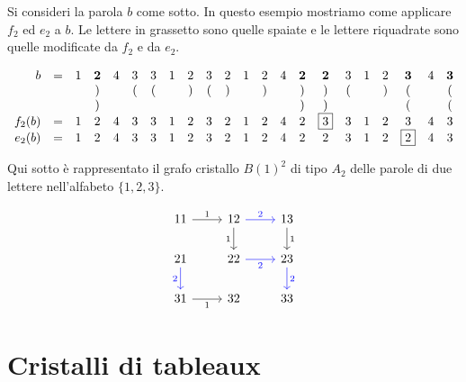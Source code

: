 \begin{example}
    Si consideri la parola $b$ come sotto.
    In questo esempio mostriamo come applicare $f_2$ ed $e_2$ a $b$.
    Le lettere in grassetto sono quelle spaiate e
    le lettere riquadrate sono quelle modificate da $f_2$ e da $e_2$.

    \[
        \begin{array}{r c *{20}{c}}
            b & = & 1 & \mathbf{2} & 4 & 3 & 3 & 1 & 2 & 3 & 2 & 1 & 2 & 4 & 
            \mathbf{2} & \mathbf{2} & 3 & 1 & 2 & \mathbf{3} & 4 & \mathbf{3} \\
              & & & \mathbf{)} & & ( & ( & & ) & ( & ) & & ) & & 
            \mathbf{)} & \mathbf{)} & ( & & ) & \mathbf{\lparen} & & \mathbf{\lparen} \\
              & & & ) & & & & & & & & & & & 
            ) & ) & & & & \lparen & & \lparen \\
            f_2(b) & = & 1 & 2 & 4 & 3 & 3 & 1 & 2 & 3 & 2 & 1 & 2 & 4 & 
            2 & \boxed{3} & 3 & 1 & 2 & 3 & 4 & 3 \\
            e_2(b) & = & 1 & 2 & 4 & 3 & 3 & 1 & 2 & 3 & 2 & 1 & 2 & 4 & 
            2 & 2 & 3 & 1 & 2 & \boxed{2} & 4 & 3
        \end{array}
    \]

\end{example}

\begin{example}
    \label{ex:crys_B1to2}
    Qui sotto \`e rappresentato il grafo cristallo $B(1)^2$ di tipo $A_2$
    delle parole di due lettere nell'alfabeto $\{1, 2, 3\}$.

    \[
        \begin{tikzcd}
            11 & 12 & 13 \\
            21 & 22 & 23 \\
            31 & 32 & 33
            \arrow["1", from=1-1, to=1-2]
            \arrow["2", from=1-2, to=1-3, color=blue]
            \arrow["1"', from=1-2, to=2-2]
            \arrow["1", from=1-3, to=2-3]
            \arrow["2"', from=2-1, to=3-1, color=blue]
            \arrow["2"', from=2-2, to=2-3, color=blue]
            \arrow["2", from=2-3, to=3-3, color=blue]
            \arrow["1"', from=3-1, to=3-2]
        \end{tikzcd}
    \]
\end{example}

\section{Cristalli di tableaux}
\label{sec:crys_tableaux}

